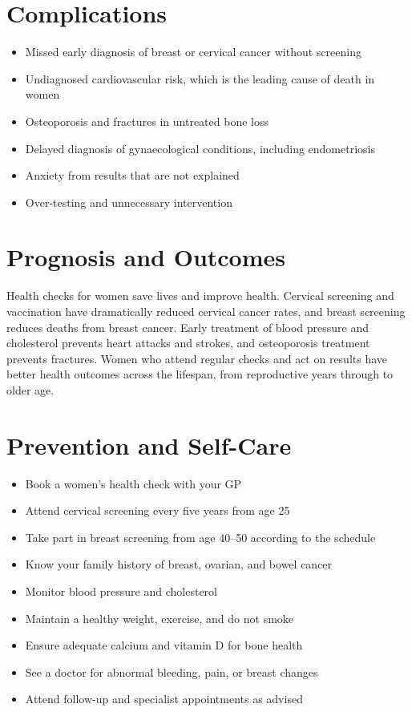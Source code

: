 \section*{Complications}
\begin{itemize}
    \item Missed early diagnosis of breast or cervical cancer without screening
    \item Undiagnosed cardiovascular risk, which is the leading cause of death in women
    \item Osteoporosis and fractures in untreated bone loss
    \item Delayed diagnosis of gynaecological conditions, including endometriosis
    \item Anxiety from results that are not explained
    \item Over-testing and unnecessary intervention
\end{itemize}

\section*{Prognosis and Outcomes}
Health checks for women save lives and improve health. Cervical screening and vaccination have dramatically reduced cervical cancer rates, and breast screening reduces deaths from breast cancer. Early treatment of blood pressure and cholesterol prevents heart attacks and strokes, and osteoporosis treatment prevents fractures. Women who attend regular checks and act on results have better health outcomes across the lifespan, from reproductive years through to older age.

\section*{Prevention and Self-Care}
\begin{itemize}
    \item Book a women's health check with your GP
    \item Attend cervical screening every five years from age 25
    \item Take part in breast screening from age 40--50 according to the schedule
    \item Know your family history of breast, ovarian, and bowel cancer
    \item Monitor blood pressure and cholesterol
    \item Maintain a healthy weight, exercise, and do not smoke
    \item Ensure adequate calcium and vitamin D for bone health
    \item See a doctor for abnormal bleeding, pain, or breast changes
    \item Attend follow-up and specialist appointments as advised
\end{itemize}

